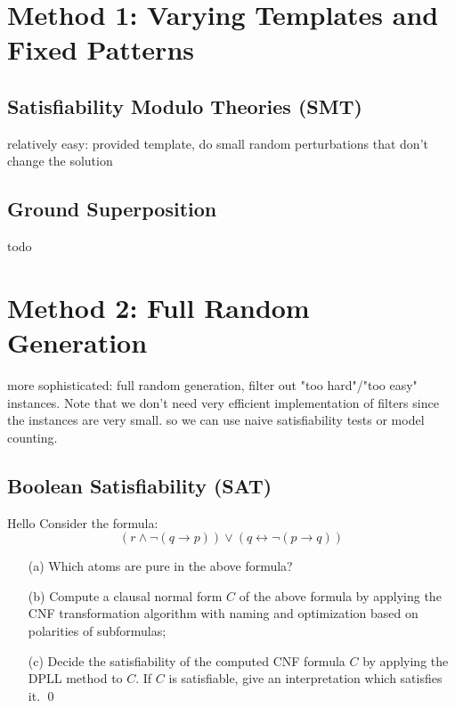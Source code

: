 \documentclass[12pt]{llncs}
\begin{document}
\section{Method 1: Varying Templates and Fixed Patterns}


\subsection{Satisfiability Modulo Theories (SMT)}

relatively easy: provided template, do small random perturbations that don't change the solution


\subsection{Ground Superposition}

todo




\section{Method 2: Full Random Generation}

more sophisticated: full random generation, filter out "too hard"/"too easy" instances.
Note that we don't need very efficient implementation of filters since the instances are very small.
so we can use naive satisfiability tests or model counting.



\subsection{Boolean Satisfiability (SAT)}

\begin{mdframed}
\begin{example}[SAT]
    Hello
Consider the formula:
\[
( r \land \lnot ( q \rightarrow p ) ) \lor ( q \leftrightarrow \lnot ( p \rightarrow q ) )
\]
\begin{itemize}
\item[(a)]
Which atoms are pure in the above formula?
\item[(b)] Compute a clausal normal form $C$ of the above formula by
  applying the CNF transformation algorithm with naming and
  optimization based on polarities of subformulas;
\item[(c)] Decide the satisfiability of the computed CNF formula $C$
  by applying  the DPLL method to $C$. If $C$ is
satisfiable,  give an interpretation which
satisfies it.
    \qed
\end{itemize}
\end{example}
\end{mdframed}
\end{document}
